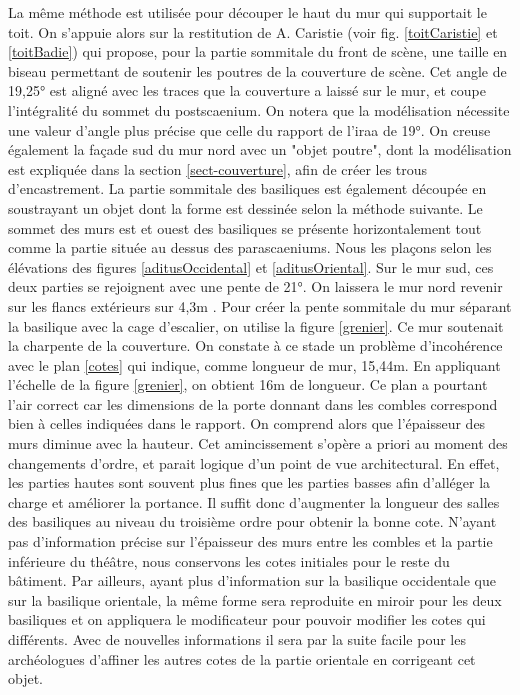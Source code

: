 La même méthode est utilisée pour découper le haut du mur qui supportait le toit. On s'appuie alors sur la restitution de A. Caristie (voir fig. \ref{toitCaristie} et \ref{toitBadie}) qui propose, pour la partie sommitale du front de scène, une taille en biseau permettant de soutenir les poutres de la couverture de scène. Cet angle de 19,25° est aligné avec les traces que la couverture a laissé sur le mur, et coupe l'intégralité du sommet du \gls{postscaenium}. On notera que la modélisation nécessite une valeur d'angle plus précise que celle du rapport de l'\gls{iraa} \cite[fig. 24]{orangeTxt} de 19°. On creuse également la façade sud du mur nord avec un "objet poutre", dont la modélisation est expliquée dans la section \ref{sect-couverture}, afin de créer les trous d'encastrement. La partie sommitale des \glspl{basilique} est également découpée en soustrayant un objet dont la forme est dessinée selon la méthode suivante. Le sommet des murs est et ouest des \glspl{basilique} se présente horizontalement tout comme la partie située au dessus des \glspl{parascaenium}. Nous les plaçons selon les élévations des figures \ref{aditusOccidental} et \ref{aditusOriental}. Sur le mur sud, ces deux parties se rejoignent avec une pente de 21°. On laissera le mur nord revenir sur les flancs extérieurs sur 4,3m \cite[p. 38]{orangeTxt}. Pour créer la pente sommitale du mur séparant la \gls{basilique} avec la cage d'escalier, on utilise la figure \ref{grenier}. Ce mur soutenait la charpente de la couverture. On constate à ce stade un problème d'incohérence avec le plan \ref{cotes} qui indique, comme longueur de mur, 15,44m. En appliquant l'échelle de la figure \ref{grenier}, on obtient 16m de longueur. Ce plan a pourtant l'air correct car les dimensions de la porte donnant dans les combles correspond bien à celles indiquées dans le rapport. On comprend alors que l'épaisseur des murs diminue avec la hauteur. Cet amincissement s'opère a priori au moment des changements d'ordre, et parait logique d'un point de vue architectural. En effet, les parties hautes sont souvent plus fines que les parties basses afin d'alléger la charge et améliorer la portance. Il suffit donc d'augmenter la longueur des salles des \glspl{basilique} au niveau du troisième ordre pour obtenir la bonne cote. N'ayant pas d'information précise sur l'épaisseur des murs entre les combles et la partie inférieure du théâtre, nous conservons les cotes initiales pour le reste du bâtiment. Par ailleurs, ayant plus d'information sur la basilique occidentale que sur la basilique orientale, la même forme sera reproduite en miroir pour les deux basiliques et on appliquera le modificateur pour pouvoir modifier les cotes qui différents. Avec de nouvelles informations il sera par la suite facile pour les archéologues d'affiner les autres cotes de la partie orientale en corrigeant cet objet.

